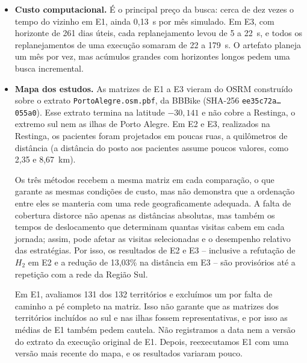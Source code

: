\documentclass[11pt,a4paper]{article}
\begin{document}
\begin{itemize}
    \item \textbf{Custo computacional.} É o principal preço da busca: cerca de dez vezes o tempo do vizinho em E1, ainda 0,13~s por mês simulado. Em E3, com horizonte de 261 dias úteis, cada replanejamento levou de 5 a 22~s, e todos os replanejamentos de uma execução somaram de 22 a 179~s. O artefato planeja um mês por vez, mas acúmulos grandes com horizontes longos pedem uma busca incremental.
    \item \textbf{Mapa dos estudos.} As matrizes de E1 a E3 vieram
do OSRM construído sobre o extrato \texttt{PortoAlegre.osm.pbf},
da BBBike (SHA-256 \texttt{ee35c72a\ldots 055a0}). Esse extrato
termina na latitude $-30{,}141$ e não cobre a Restinga, o
extremo sul nem as ilhas de Porto Alegre. Em E2 e E3, realizados
na Restinga, os pacientes foram projetados em poucas ruas, a
quilômetros de distância (a distância do posto aos pacientes
assume poucos valores, como 2,35 e 8,67~km).

Os três métodos recebem a mesma matriz em cada comparação, o
que garante as mesmas condições de custo, mas não demonstra que
a ordenação entre eles se manteria com uma rede geograficamente
adequada. A falta de cobertura distorce não apenas as distâncias
absolutas, mas também os tempos de deslocamento que determinam
quantas visitas cabem em cada jornada; assim, pode afetar as
visitas selecionadas e o desempenho relativo das estratégias.
Por isso, os resultados de E2 e E3 -- inclusive a refutação de
$H_2$ em E2 e a redução de 13,03\% na distância em E3 -- são
provisórios até a repetição com a rede da Região Sul.

Em E1, avaliamos 131 dos 132 territórios e excluímos um por
falta de caminho a pé completo na matriz. Isso não garante que
as matrizes dos territórios incluídos ao sul e nas ilhas fossem
representativas, e por isso as médias de E1 também pedem
cautela. Não registramos a data nem a versão do extrato da
execução original de E1. Depois, reexecutamos E1 com uma versão
mais recente do mapa, e os resultados variaram pouco.


\end{itemize}
\end{document}
